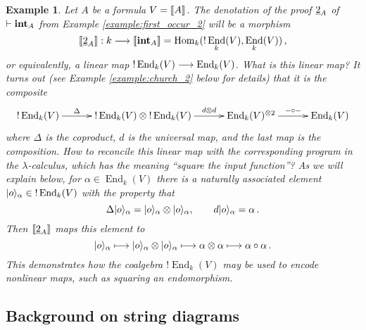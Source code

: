 \documentclass[english,letter paper,12pt,reqno]{article}
\DeclarePairedDelimiter\ket{\lvert}{\rangle}
\theoremstyle{example}
\newtheorem{example}[theorem]{Example}
\numberwithin{equation}{section}
\def\Hom{\operatorname{Hom}}
\DeclareMathOperator{\End}{End}
\def\inta{\bold{int}}
\begin{document}
\begin{example}\label{example:2_denotation_preview} Let $A$ be a formula $V = \llbracket A \rrbracket$. The denotation of the proof $\underline{2}_A$ of $\vdash \inta_A$ from Example \ref{example:first_occur_2} will be a morphism
\begin{equation}\label{eq:2_as_comp_0}
\den{\church{2}_A}: k \lto \den{\inta_A} = \Hom_k( {!} \End_k(V), \End_k(V) )\,,
\end{equation}
or equivalently, a linear map ${!} \End_k(V) \lto \End_k(V)$. What is this linear map? It turns out (see Example \ref{example:church_2} below for details) that it is the composite
\begin{equation}\label{eq:2_as_comp}
\xymatrix@C+0.5pc{
{!} \End_k(V) \ar[r]^-{\Delta} & {!} \End_k(V) \otimes {!} \End_k(V) \ar[r]^-{d \otimes d} & \End_k(V)^{\otimes 2} \ar[r]^-{- \circ -} & \End_k(V)
}
\end{equation}
where $\Delta$ is the coproduct, $d$ is the universal map, and the last map is the composition. How to reconcile this linear map with the corresponding program in the $\lambda$-calculus, which has the meaning ``square the input function''? As we will explain below, for $\alpha \in \End_k( V )$ there is a naturally associated element $\ket{o}_\alpha \in {!} \End_k(V)$ with the property that
\[
\Delta \ket{o}_\alpha = \ket{o}_\alpha \otimes \ket{o}_\alpha, \qquad d \ket{o}_\alpha = \alpha\,.
\]
Then $\llbracket \underline{2}_A \rrbracket$ maps this element to
\begin{equation}\label{eq:2_deals_with_0}
\ket{o}_\alpha \longmapsto \ket{o}_\alpha \otimes \ket{o}_\alpha \longmapsto \alpha \otimes \alpha \longmapsto \alpha \circ \alpha\,.
\end{equation}
This demonstrates how the coalgebra ${!} \End_k(V)$ may be used to encode nonlinear maps, such as squaring an endomorphism.
\end{example}

\subsection{Background on string diagrams}

\end{document}
